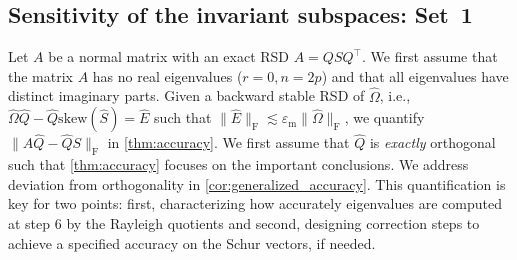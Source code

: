 \documentclass[10pt,twoside,dvipsnames]{siamart1116}
\numberwithin{algorithm}{section}
\numberwithin{equation}{section}
\begin{document}
\subsection{Sensitivity of the invariant subspaces: Set~1}
Let $A$ be a normal matrix with an exact RSD $A=QSQ^\top$. We first assume that the matrix $A$ has no real eigenvalues ($r=0, n=2p$) and that all eigenvalues have distinct imaginary parts. Given a backward stable RSD of $\widehat{\Omega}$, i.e., $\widehat{\Omega} \widehat{Q} -\widehat{Q}\mathrm{skew}(\widehat{S})=\widehat{E}$ such that $ \|\widehat{E}\|_\mathrm{F}\lesssim \varepsilon_\mathrm{m} \|\widehat{\Omega}\|_\mathrm{F}$, we quantify $\|A \widehat{Q} -\widehat{Q}S\|_\mathrm{F}$ in \cref{thm:accuracy}. We first assume that $\widehat{Q}$ is \emph{exactly} orthogonal such that \cref{thm:accuracy} focuses on the important conclusions. We address deviation from orthogonality in \cref{cor:generalized_accuracy}. This quantification is key for two points: first, characterizing how accurately eigenvalues are computed at step 6 by the Rayleigh quotients and second, designing correction steps to achieve a specified accuracy on the Schur vectors, if needed.
\end{document}
